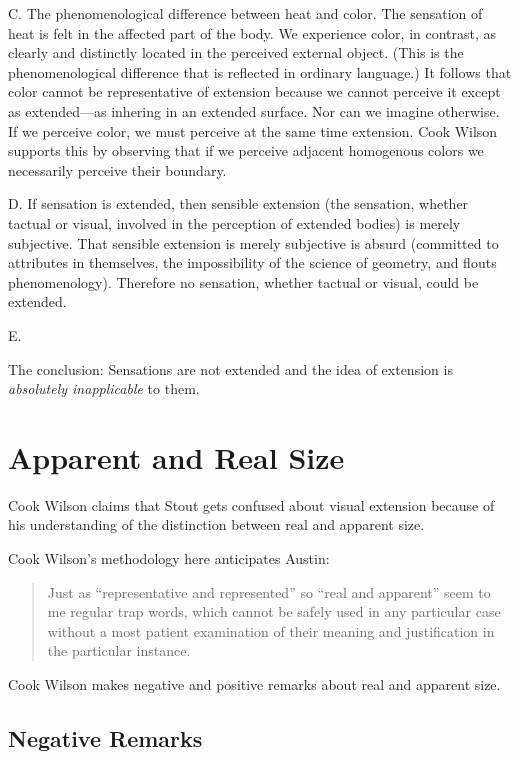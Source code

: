 \documentclass[11pt]{article}
\begin{document}
C. The phenomenological difference between heat and color. The sensation of heat is felt in the affected part of the body. We experience color, in contrast, as clearly and distinctly located in the perceived external object. (This is the phenomenological difference that is reflected in ordinary language.) It follows that color cannot be representative of extension because we cannot perceive it except as extended---as inhering in an extended surface. Nor can we imagine otherwise. If we perceive color, we must perceive at the same time extension. Cook Wilson supports this by observing that if we perceive adjacent homogenous colors we necessarily perceive their boundary.

D. If sensation is extended, then sensible extension (the sensation, whether tactual or visual, involved in the perception of extended bodies) is merely subjective. That sensible extension is merely subjective is absurd (committed to attributes in themselves, the impossibility of the science of geometry, and flouts phenomenology). Therefore no sensation, whether tactual or visual, could be extended.

E. 

The conclusion: Sensations are not extended and the idea of extension is \emph{absolutely inapplicable} to them.


\section{Apparent and Real Size}\label{sec:apparent_and_real_size} %

Cook Wilson claims that Stout gets confused about visual extension because of his understanding of the distinction between real and apparent size. 

Cook Wilson's methodology here anticipates Austin:

    \begin{quote}
    	Just as ``representative and represented'' so ``real and apparent'' seem to me regular trap words, which cannot be safely used in any particular case without a most patient examination of their meaning and justification in the particular instance.
    \end{quote}

Cook Wilson makes negative and positive remarks about real and apparent size.

\subsection{Negative Remarks}\label{sub:negative_remarks} %
\end{document}

